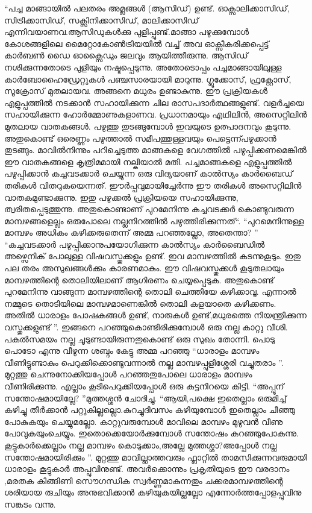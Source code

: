 “പച്ച മാങ്ങായിൽ പലതരം അമ്ലങ്ങൾ (ആസിഡ്) ഉണ്ട്. ഓക്സാലിക്കാസിഡ്, സിട്രിക്കാസിഡ്, സക്സിനിക്കാസിഡ്, മാലിക്കാസിഡ് എന്നിവയാണവ.ആസിഡുകൾക്കു പുളിപ്പുണ്ട്.മാങ്ങാ പഴുക്കുമ്പോൾ കോശങ്ങളിലെ മൈറ്റോകോൺട്രിയയിൽ വച്ച് അവ ഓക്സീകരിക്കപ്പെട്ട് കാർബൺ ഡൈ ഓക്സൈഡും ജലവും ആയിത്തീരുന്നു. ആസിഡ് നശിക്കുന്നതോടെ പുളിയും നഷ്ടപ്പെടുന്നു. അതോടൊപ്പം പച്ചമാങ്ങായിലുള്ള കാർബോഹൈഡ്രേറ്റുകൾ പഞ്ചസാരയായി മാറുന്നു. ഗ്ലൂക്കോസ്, ഫ്രക്റ്റോസ്, സൂക്രോസ് മുതലായവ. അങ്ങനെ മധുരം ഉണ്ടാകുന്നു.
ഈ പ്രക്രിയകൾ എളുപ്പത്തിൽ നടക്കാൻ സഹായിക്കുന്ന ചില രാസപദാർത്ഥങ്ങളുണ്ട്. വളർച്ചയെ സഹായിക്കുന്ന ഹോർമ്മോണുകളാണവ. പ്രധാനമായും എഥിലിൻ, അസെറ്റിലിൻ മുതലായ വാതകങ്ങൾ. പഴുത്തു തുടങ്ങുമ്പോൾ ഇവയുടെ ഉത്പാദനവും കൂടുന്നു. അതുകൊണ്ട് ഒരെണ്ണം പഴുത്താൽ സമീപത്തുള്ളവയും പെട്ടെന്ന്പഴുക്കാൻ തുടങ്ങും. മാവിൽനിന്നും പറിച്ചെടുത്ത മാങ്ങകളെ വേഗത്തിൽ പഴുപ്പിക്കണമെങ്കിൽ ഈ വാതകങ്ങളെ കൃത്രിമമായി നല്കിയാൽ മതി. പച്ചമാങ്ങകളെ എളുപ്പത്തിൽ പഴുപ്പിക്കാൻ കച്ചവടക്കാർ ചെയ്യുന്ന ഒരു വിദ്യയാണ്‌ കാൽസ്യം കാർബൈഡ് തരികൾ വിതറുകയെന്നത്. ഈർപ്പവുമായിച്ചേർന്നു ഈ തരികൾ അസെറ്റിലിൻ വാതകമുണ്ടാക്കുന്നു. ഇതു പഴുക്കൽ പ്രക്രിയയെ സഹായിക്കുന്നു, ത്വരിതപ്പെടുത്തുന്നു. അതുകൊണ്ടാണ്‌ പുറമേനിന്നു കച്ചവടക്കർ കൊണ്ടുവരുന്ന മാമ്പഴങ്ങളെല്ലം ഒരുപോലെ നല്ലനിറത്തിൽ പഴുത്തിരിക്കുന്നത്“.
“പുറമെനിന്നുള്ള മാമ്പഴം അധികം കഴിക്കരുതെന്ന് അമ്മ പറഞ്ഞല്ലോ, അതെന്താ? ”
“കച്ചവടക്കാർ പഴുപ്പിക്കാനുപയോഗിക്കുന്ന കാൽസ്യം കാർബൈഡിൽ അഴ്സെനിക് പോലുള്ള വിഷവസ്തുക്കളും ഉണ്ട്. ഇവ മാമ്പഴത്തിൽ കടന്നുകൂടും. ഇതു പല തരം അസുഖങ്ങൾക്കും കാരണമാകും. ഈ വിഷവസ്തുക്കൾ കൂടുതലായും മാമ്പഴത്തിന്റെ തൊലിയിലാണ്‌ ആഗിരണം ചെയ്യപ്പെടുക. അതുകൊണ്ട് പുറമേനിന്നു വാങ്ങുന്ന മാമ്പഴത്തിന്റെ തൊലി ചെത്തിയേ കഴിക്കാവൂ. എന്നാൽ നമ്മുടെ തൊടിയിലെ മാമ്പഴമാണെങ്കിൽ തൊലി കളയാതെ കഴിക്കണം. അതിൽ ധാരാളം പോഷകങ്ങൾ ഉണ്ട്, നാരുകൾ ഉണ്ട്,മധുരത്തെ നിയന്ത്രിക്കുന്ന വസ്തുക്കളുണ്ട് ”.
ഇങ്ങനെ പറഞ്ഞുകൊണ്ടിരിക്കുമ്പോൾ ഒരു നല്ല കാറ്റു വീശി. പകൽസമയം നല്ല ചൂടുണ്ടായിരുന്നതുകൊണ്ട് ഒരു സുഖം തോന്നി. പൊടു പൊടോ എന്നു വീഴുന്ന ശബ്ദം കേട്ടു അമ്മ പറഞ്ഞു
“ധാരാളം മാമ്പഴം വീണിട്ടുണ്ടാകും പെറുക്കിക്കൊണ്ടുവന്നാൽ നല്ല മാമ്പഴപ്പുളിശ്ശേരി വച്ചുതരാം ”.
മുറ്റത്തു ചെന്നുനോക്കിയപ്പോൾ പറഞ്ഞതുപോലെ ധാരാളം മാമ്പഴം വീണിരിക്കുന്നു. എല്ലാം കൂടിപെറുക്കിയപ്പോൾ ഒരു കുട്ടനിറയെ കിട്ടി.
“അപ്പൂന്‌ സന്തോഷമായില്ലേ? ”മുത്തശ്ശൻ ചോദിച്ചു.
“ആയി,പക്ഷെ ഇതെല്ലാം ഒരുമിച്ച് കഴിച്ചു തീർക്കാൻ പറ്റുകില്ലല്ലൊ.കുറച്ചുദിവസം കഴിയുമ്പോൾ ഇതെല്ലാം ചീഞ്ഞു പോകുകയും ചെയ്യുമല്ലോ. കാറ്റുവരുമ്പോൾ മാവിലെ മാമ്പഴം മുഴുവൻ വീണു പോവുകയുംചെയ്യും. ഇതൊക്കെയോർക്കുമ്പോൾ സന്തോഷം കുറഞ്ഞുപോകുന്നു. കൂട്ടുകാർക്കെല്ലാം നല്ല മാമ്പഴം കൊടുക്കാം,അല്ലേ മുത്തശ്ശാ?അപ്പോൾ നല്ല സന്തോഷമായിരിക്കും ”.
  മുറ്റത്തു മാവില്ലാത്തവരും ഫ്ലാറ്റിൽ താമസിക്കുന്നവരുമായി ധാരാളം കൂട്ടുകാർ അപ്പുവിനുണ്ട്. അവർക്കൊന്നും പ്രകൃതിയുടെ ഈ വരദാനം ,മരതക കിങ്ങിണി സൌഗന്ധിക സ്വർണ്ണമാകുന്നതും ചക്കരമാമ്പഴത്തിന്റെ ശരിയായ രുചിയും അനുഭവിക്കാൻ കഴിയുകയില്ലല്ലോ എന്നോർത്തപ്പോളപ്പുവിനു സങ്കടം വന്നു.
